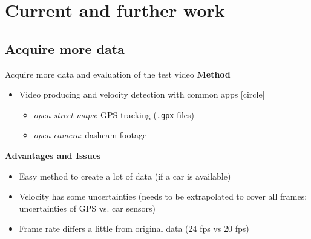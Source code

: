 \section{Current and further work}

\subsection{Acquire more data}
\begin{frame}{Acquire more data and evaluation of the test video}
	\textbf{Method}
	\begin{itemize}
		\item Video producing and velocity detection with common apps
		[circle]
		\begin{itemize}
		\item \textit{open street maps}: GPS tracking (\texttt{.gpx}-files)
		\item \textit{open camera}: dashcam footage
		\end{itemize}				
	\end{itemize}
	\textbf{Advantages and Issues}
	\begin{itemize}
		\item Easy method to create a lot of data (if a car is available)
		\item Velocity has some uncertainties (needs to be extrapolated to cover all frames; uncertainties of GPS vs. car sensors)
		\item Frame rate differs a little from original data (24 fps vs 20 fps)
	\end{itemize}
\end{frame}

